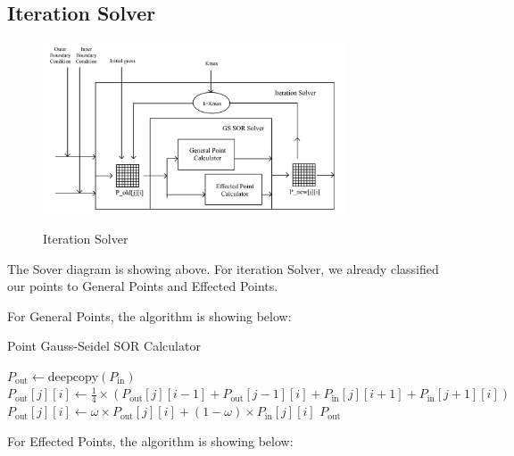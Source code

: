 \documentclass[12pt]{article}
\begin{document}
\subsection{Iteration Solver}




\begin{figure}[H]
    \centering
    \includegraphics[width=0.8\textwidth]{Solver-It.jpg}
    \label{Grid Generator.jpg}
    \caption{Iteration Solver}
\end{figure}


The Sover diagram is showing above.
For iteration Solver, we already classified our points to General Points and 
Effected Points.


For General Points, the algorithm is showing below:

\begin{algorithm}
    \caption{Point Gauss-Seidel SOR Calculator}
    \begin{algorithmic}[1]
        \State $P_{\text{out}} \gets \text{deepcopy}(P_{\text{in}})$
                \State $P_{\text{out}}[j][i] \gets \frac{1}{4} \times (P_{\text{out}}[j][i-1] + P_{\text{out}}[j-1][i] + P_{\text{in}}[j][i+1] + P_{\text{in}}[j+1][i])$
                \State $P_{\text{out}}[j][i] \gets \omega \times P_{\text{out}}[j][i] + (1 - \omega) \times P_{\text{in}}[j][i]$
            \EndFor
        \EndFor
        \State \Return $P_{\text{out}}$
    \EndProcedure
    \end{algorithmic}
    \end{algorithm}

    For Effected Points, the algorithm is showing below:\\
    
\end{document}
